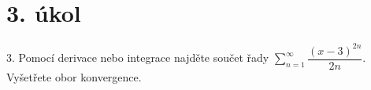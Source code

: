 \section{3. úkol}
  3. Pomocí derivace nebo integrace najděte součet řady $\sum\limits_{n=1}^\infty \dfrac{(x-3)^{2n}}{2n}$. Vyšetřete obor konvergence.
